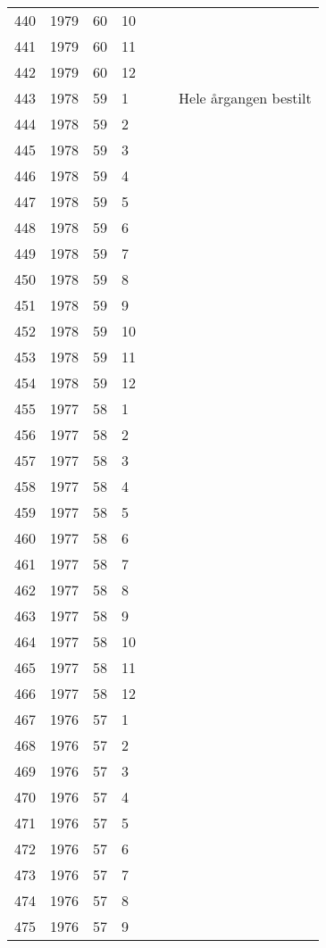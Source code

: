 \begin{longtable}{ |l|l|l|l|l|l|l| }
440 & 1979 & 60 & 10 &  &  &  \\
441 & 1979 & 60 & 11 &  &  &  \\
442 & 1979 & 60 & 12 &  &  &  \\
443 & 1978 & 59 & 1 &  &  & Hele årgangen bestilt \\
444 & 1978 & 59 & 2 &  &  &  \\
445 & 1978 & 59 & 3 &  &  &  \\
446 & 1978 & 59 & 4 &  &  &  \\
447 & 1978 & 59 & 5 &  &  &  \\
448 & 1978 & 59 & 6 &  &  &  \\
449 & 1978 & 59 & 7 &  &  &  \\
450 & 1978 & 59 & 8 &  &  &  \\
451 & 1978 & 59 & 9 &  &  &  \\
452 & 1978 & 59 & 10 &  &  &  \\
453 & 1978 & 59 & 11 &  &  &  \\
454 & 1978 & 59 & 12 &  &  &  \\
455 & 1977 & 58 & 1 &  &  &  \\
456 & 1977 & 58 & 2 &  &  &  \\
457 & 1977 & 58 & 3 &  &  &  \\
458 & 1977 & 58 & 4 &  &  &  \\
459 & 1977 & 58 & 5 &  &  &  \\
460 & 1977 & 58 & 6 &  &  &  \\
461 & 1977 & 58 & 7 &  &  &  \\
462 & 1977 & 58 & 8 &  &  &  \\
463 & 1977 & 58 & 9 &  &  &  \\
464 & 1977 & 58 & 10 &  &  &  \\
465 & 1977 & 58 & 11 &  &  &  \\
466 & 1977 & 58 & 12 &  &  &  \\
467 & 1976 & 57 & 1 &  &  &  \\
468 & 1976 & 57 & 2 &  &  &  \\
469 & 1976 & 57 & 3 &  &  &  \\
470 & 1976 & 57 & 4 &  &  &  \\
471 & 1976 & 57 & 5 &  &  &  \\
472 & 1976 & 57 & 6 &  &  &  \\
473 & 1976 & 57 & 7 &  &  &  \\
474 & 1976 & 57 & 8 &  &  &  \\
475 & 1976 & 57 & 9 &  &  &  \\

\end{longtable}
